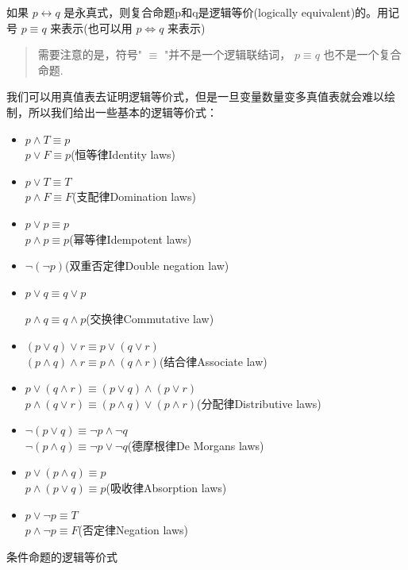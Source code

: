 \documentclass[12pt,a4paper,oneside]{ctexart}
\begin{document}
如果 \(p\leftrightarrow q\) 是永真式，则复合命题p和q是逻辑等价(logically equivalent)的。用记号 \(p\equiv q\) 来表示(也可以用 \(p\Leftrightarrow q\) 来表示)

\begin{quote}
需要注意的是，符号" \(\equiv\) "并不是一个逻辑联结词， \(p\equiv q\) 也不是一个复合命题.
\end{quote}

我们可以用真值表去证明逻辑等价式，但是一旦变量数量变多真值表就会难以绘制，所以我们给出一些基本的逻辑等价式：

\begin{itemize}
\item
  \(p\wedge T\equiv p\)\\
  \(p\vee F\equiv p\)(恒等律Identity laws)
\item
  \(p\vee T\equiv T\)\\
  \(p\wedge F\equiv F\)(支配律Domination laws)
\item
  \(p\vee p\equiv p\)\\
  \(p\wedge p\equiv p\)(幂等律Idempotent laws)
\item
  \(\neg(\neg p)\)(双重否定律Double negation law)
\item
  \(p\vee q\equiv q\vee p\)

  \(p\wedge q\equiv q\wedge p\)(交换律Commutative law)
\item
  \((p\vee q)\vee r\equiv p\vee(q\vee r)\)\\
  \((p\wedge q)\wedge r\equiv p\wedge(q\wedge r)\)(结合律Associate law)
\item
  \(p\vee(q\wedge r)\equiv (p\vee q)\wedge(p\vee r)\)\\
  \(p\wedge(q\vee r)\equiv(p\wedge q)\vee(p\wedge r)\)(分配律Distributive laws)
\item
  \(\neg(p\vee q)\equiv \neg p\wedge\neg q\)\\
  \(\neg(p\wedge q)\equiv\neg p\vee \neg q\)(德摩根律De Morgan\textquotesingle s laws)
\item
  \(p\vee(p\wedge q)\equiv p\)\\
  \(p\wedge(p\vee q)\equiv p\)(吸收律Absorption laws)
\item
  \(p\vee\neg p\equiv T\)\\
  \(p\wedge \neg p\equiv F\)(否定律Negation laws)
\end{itemize}

条件命题的逻辑等价式
\end{document}
